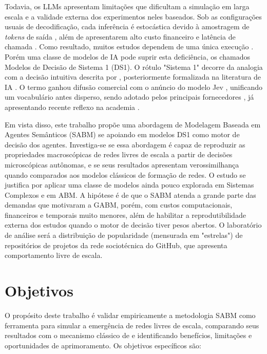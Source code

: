 \documentclass[12pt,oneside,a4paper,brazil,sumario=tradicional]{abntex2}
\begin{document}
Todavia, os LLMs apresentam limitações que dificultam a simulação em larga escala e a validade externa dos experimentos neles baseados. Sob as configurações usuais de decodificação, cada inferência é estocástica devido à amostragem de \textit{tokens} de saída \parencite{zhao2023,minaee2024}, além de apresentarem alto custo financeiro e latência de chamada \parencite{chopra2024,taillandier2026}. Como resultado, muitos estudos dependem de uma única execução \parencite{larooij2025}. Porém uma classe de modelos de IA pode suprir esta deficiência, os chamados Modelos de Decisão de Sistema 1 (DS1). O rótulo "Sistema 1" decorre da analogia com a decisão intuitiva descrita por \textcite{kahneman2003}, posteriormente formalizada na literatura de IA \parencite{bengio2019, booch2021, goyal2022}. O termo ganhou difusão comercial com o anúncio do modelo Jev \parencite{typesafe2026}, unificando um vocabulário antes disperso, sendo adotado pelos principais fornecedores \parencite{microsoft2026, cloudflare2026, openai2026}, já apresentando recente reflexo na academia \parencite{santos2026,du2026reliable,azizi2026labelsoverridedefinitionsjevstyle}.

Em vista disso, este trabalho propõe uma abordagem de Modelagem Baseada em Agentes Semânticos (SABM) se apoiando em modelos DS1 como motor de decisão dos agentes.  Investiga-se se essa abordagem é capaz de reproduzir as propriedades macroscópicas de redes livres de escala a partir de decisões microscópicas autônomas, e se seus resultados apresentam verossimilhança quando comparados aos modelos clássicos de formação de redes. O estudo se justifica por aplicar uma classe de modelos ainda pouco explorada em Sistemas Complexos e em ABM. A hipótese é de que o SABM atenda a grande parte das demandas que motivaram a GABM, porém, com custos computacionais, financeiros e temporais muito menores, além de habilitar a reprodutibilidade externa dos estudos quando o motor de decisão tiver pesos abertos. O laboratório de análise será a distribuição de popularidade (mensurada em "estrelas") de repositórios de projetos da rede sociotécnica do GitHub, que apresenta comportamento livre de escala.

\section{Objetivos}

O propósito deste trabalho é validar empiricamente a metodologia SABM como ferramenta para simular a emergência de redes livres de escala, comparando seus resultados com o mecanismo clássico de \textcite{barabasi1999} e identificando benefícios, limitações e oportunidades de aprimoramento. Os objetivos específicos são:
\end{document}
